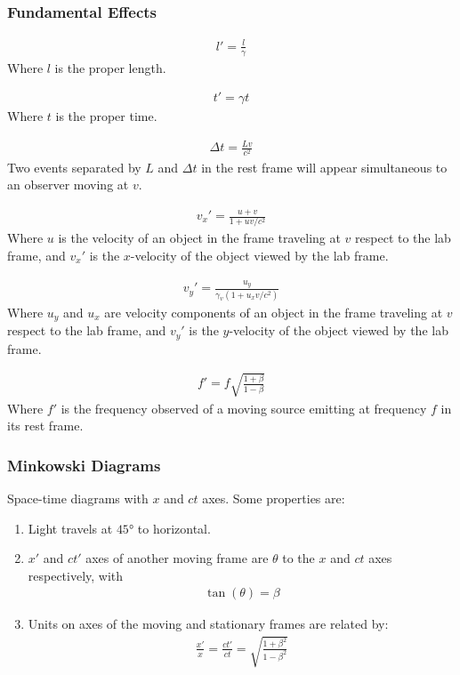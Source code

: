 \documentclass[a4paper]{article}
\begin{document}
\begin{multicols*}{2}
\subsubsection{Fundamental Effects}
\begin{description}
  \setlength{\itemsep}{2.5mm}
\item[Length contraction]
  \begin{align*}
    l'=\frac{l}{\gamma}
  \end{align*}
  Where $l$ is the proper length.
\item[Time dilation]
  \begin{align*}
    t'=\gamma t
  \end{align*}
  Where $t$ is the proper time.
\item [Loss of simultaneity]
  \begin{align*}
    \Delta t = \frac{Lv}{c^2}
  \end{align*}
  Two events separated by $L$ and $\Delta t$ in the rest frame will appear
  simultaneous to an observer moving at $v$.
\item[Longitudinal velocity addition]
  \begin{align*}
    v_x'=\frac{u+v}{1+uv/c^2}
  \end{align*}
  Where $u$ is the velocity of an object in the frame traveling at $v$ respect
  to the lab frame, and $v_x'$ is the $x$-velocity of the object viewed by the
  lab frame.
\item[Transverse velocity addition]
  \begin{align*}
    v_y'=\frac{u_y}{\gamma_v ( 1+ u_xv/c^2)}
  \end{align*}
  Where $u_y$ and $u_x$ are velocity components of an object in the frame
  traveling at $v$ respect to the lab frame, and $v_y'$ is the $y$-velocity of
  the object viewed by the lab frame.
\item[Longitudinal Doppler effect]
  \begin{align*}
    f'=f\sqrt{\frac{1+\beta}{1-\beta}}
  \end{align*}
  Where $f'$ is the frequency observed of a moving source emitting at frequency
  $f$ in its rest frame.
\end{description}
\subsubsection{Minkowski Diagrams}
Space-time diagrams with $x$ and $ct$ axes. Some properties are:
\begin{enumerate}
\item Light travels at $\ang{45}$ to horizontal.
\item $x'$ and $ct'$ axes of another moving frame are $\theta$ to the $x$ and
  $ct$ axes respectively, with
  \begin{align*}
    \tan(\theta)=\beta
  \end{align*}
\item Units on axes of the moving and stationary frames are related by:
  \begin{align*}
    \frac{x'}{x}=\frac{ct'}{ct}=\sqrt{\frac{1+\beta^2}{1-\beta^2}}
  \end{align*}
\end{enumerate}

\end{multicols*}
\end{document}
